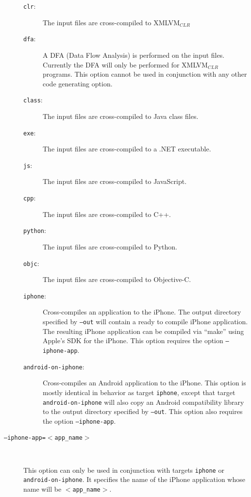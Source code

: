 \documentclass[11pt]{book}
\begin{document}
\begin{description}
\begin{description}
\item[\texttt{clr}:] The input files are cross-compiled to
  XMLVM$_{CLR}$

\item[\texttt{dfa}:] A DFA (Data Flow Analysis) is performed on the
  input files. Currently the DFA will only be performed for
  XMLVM$_{CLR}$ programs. This option cannot be used in conjunction
  with any other code generating option.

\item[\texttt{class}:] The input files are cross-compiled to Java
  class files.

\item[\texttt{exe}:] The input files are cross-compiled to a .NET
  executable.

\item[\texttt{js}:] The input files are cross-compiled to JavaScript.

\item[\texttt{cpp}:] The input files are cross-compiled to C++.

\item[\texttt{python}:] The input files are cross-compiled to Python.

\item[\texttt{objc}:] The input files are cross-compiled to
  Objective-C.

\item[\texttt{iphone}:] Cross-compiles an application to the iPhone.
  The output directory specified by \texttt{--out} will contain a
  ready to compile iPhone application.  The resulting iPhone
  application can be compiled via ``make'' using Apple's SDK for the
  iPhone. This option requires the option \texttt{--iphone-app}.

\item[\texttt{android-on-iphone}:] Cross-compiles an Android
  application to the iPhone.  This option is mostly identical in
  behavior as target \texttt{iphone}, except that target
  \texttt{android-on-iphone} will also copy an Android compatibility
  library to the output directory specified by \texttt{--out}. This
  option also requires the option \texttt{--iphone-app}.
\end{description}

\item[\texttt{--iphone-app=$<$app\_name$>$}] $ $

  This option can only be used in conjunction with targets
  \texttt{iphone} or \texttt{android-on-iphone}. It specifies the name
  of the iPhone application whose name will be
  \texttt{$<$app\_name$>$}.


\end{description}
\end{document}
